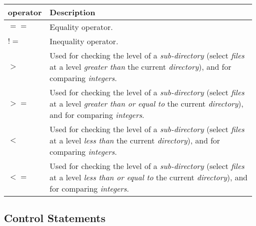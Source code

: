 \documentclass[11pt]{article}
\begin{document}
\begin{table}[ht]
  \centering
  \vspace{0.5em}
  \begin{tabular}{|m{8em}|b{34em}|}
  \hline

  \textbf{operator}
  &
  \vspace{0.7em}
  \textbf{Description} \\ [0.7em]
  \hline

  $==$
  &
  \vspace{0.7em}
  Equality operator.
  \\[0.7em]
  \hline

  $!=$
  &
  \vspace{0.7em}
  Inequality operator.
  \\[0.7em]
  \hline

  $>$
  &
  \vspace{0.7em}
  Used for checking the level of a \emph{sub-directory} (select \emph{files} at a level \emph{greater than} the current \emph{directory}), and for comparing \emph{integers}.
  \\[0.7em]
  \hline

  $>=$
  &
  \vspace{0.7em}
  Used for checking the level of a \emph{sub-directory} (select \emph{files} at a level \emph{greater than or equal to} the current \emph{directory}), and for comparing \emph{integers}.
  \\[0.7em]
  \hline

  $<$
  &
  \vspace{0.7em}
  Used for checking the level of a \emph{sub-directory} (select \emph{files} at a level \emph{less than} the current \emph{directory}), and for comparing \emph{integers}.
  \\[0.7em]
  \hline

  $<=$
  &
  \vspace{0.7em}
  Used for checking the level of a \emph{sub-directory} (select \emph{files} at a level \emph{less than or equal to} the current \emph{directory}), and for comparing \emph{integers}.
  \\[0.7em]
  \hline

  \end{tabular}
\end{table}

\newpage

\subsection{Control Statements}
\end{document}
